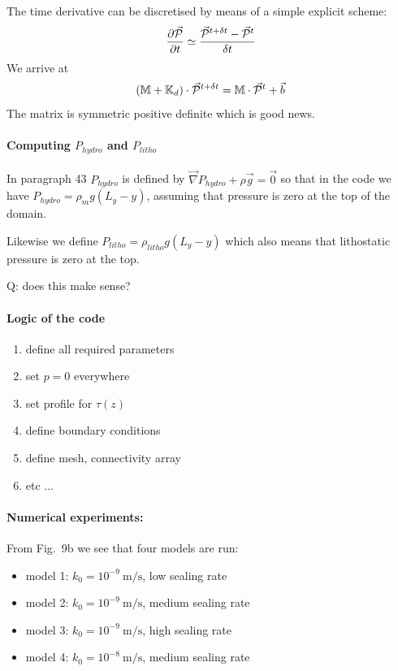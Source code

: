 The time derivative can be discretised by means of a simple explicit scheme:
\[
\frac{\partial \vec{\cal P}}{\partial t} \simeq
\frac{ \vec{\cal P}^{t+\delta t} - \vec{\cal P}^t  }{\delta t}
\]
We arrive at 
\[
( {{\mathbb{M}}} + {{\mathbb{K}}}_d) \cdot \vec{\cal P}^{t+\delta t} = {{\mathbb{M}}} \cdot \vec{\cal P}^t  + \vec{b}
\]
The matrix is symmetric positive definite which is good news.

\paragraph{Computing $P_{hydro}$ and $P_{litho}$}

In paragraph 43 $P_{hydro}$ is defined by
$\vec\nabla P_{hydro} + \rho \vec{g} = \vec{0}$ 
so that in the code we have $P_{hydro}=\rho_m g (L_y -y)$, 
assuming that pressure is zero at the top of the domain. 

Likewise we define $P_{litho}=\rho_{litho} g (L_y -y)$ which 
also means that lithostatic pressure is zero at the top. 

{\Large Q}: does this make sense?



\paragraph{Logic of the code}

\begin{enumerate}
\item define all required parameters
\item set $p=0$ everywhere
\item set profile for $\tau(z)$
\item define boundary conditions
\item define mesh, connectivity array
\item etc ...
\end{enumerate}

\paragraph{Numerical experiments:} From Fig.~9b we see that four models are run:
\begin{itemize}
\item model 1: $k_0=10^{-9}~\si{\meter\per\second}$, low sealing rate
\item model 2: $k_0=10^{-9}~\si{\meter\per\second}$, medium sealing rate
\item model 3: $k_0=10^{-9}~\si{\meter\per\second}$, high sealing rate
\item model 4: $k_0=10^{-8}~\si{\meter\per\second}$, medium sealing rate
\end{itemize}


